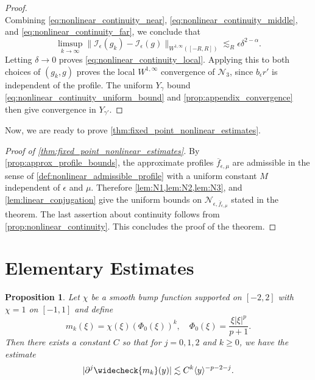 \documentclass[11pt]{amsart}
\newtheorem{proposition}[theorem]{Proposition}
\theoremstyle{definition}
\theoremstyle{remark}
\numberwithin{equation}{section}
\newcommand{\mc}[1]{\mathcal{#1}}
\newcommand{\ov}[1]{\overline{#1}}
\newcommand{\ang}[1]{\langle #1 \rangle}
\begin{document}
\begin{proof}
\begin{equation}
    \end{equation}
    Combining \eqref{eq:nonlinear_continuity_near}, \eqref{eq:nonlinear_continuity_middle}, and \eqref{eq:nonlinear_continuity_far}, we conclude that
    \[\limsup_{k\to\infty}\|\mc{I}_\epsilon(g_k)-\mc{I}_\epsilon(g)\|_{W^{1,\infty}([-R,R])}
    \lesssim_R\epsilon\delta^{2-\alpha}.\]
    Letting $\delta\to0$ proves \eqref{eq:nonlinear_continuity_local}. Applying this to both choices of $(g_k,g)$ proves the local $W^{1,\infty}$ convergence of $\mc{N}_3$, since $b_\epsilon r'$ is independent of the profile. The uniform $Y_\gamma$ bound \eqref{eq:nonlinear_continuity_uniform_bound} and \cref{prop:appendix_convergence} then give convergence in $Y_{\gamma'}$.
\end{proof}

Now, we are ready to prove \cref{thm:fixed_point_nonlinear_estimates}.

\begin{proof}[Proof of \cref{thm:fixed_point_nonlinear_estimates}]
    By \cref{prop:approx_profile_bounds}, the approximate profiles $\ov{f}_{\epsilon,\mu}$ are admissible in the sense of \cref{def:nonlinear_admissible_profile} with a uniform constant $M$ independent of $\epsilon$ and $\mu$. Therefore \cref{lem:N1,lem:N2,lem:N3}, and \cref{lem:linear_conjugation} give the uniform bounds on $\mc{N}_{\epsilon, \ov{f}_{\epsilon, \mu}}$ stated in the theorem. The last assertion about continuity follows from \cref{prop:nonlinear_continuity}. This concludes the proof of the theorem.
\end{proof}


\appendix

\section{Elementary Estimates}

\begin{proposition}\label{prop:appendix_nonsmooth_fourier_inverse}
    Let $\chi$ be a smooth bump function supported on $[-2, 2]$ with $\chi = 1$ on $[-1, 1]$ and define
    \[m_k(\xi) = \chi(\xi)(\Phi_0(\xi))^k, \quad \Phi_0(\xi) = \frac{\xi|\xi|^p}{p+1}.\]
    Then there exists a constant $C$ so that for $j = 0, 1, 2$ and $k \geq 0$, we have the estimate
    \[|\partial^j \widecheck{m_k}(y)| \lesssim C^k \ang{y}^{-p - 2 - j}.\]
\end{proposition}
\end{document}

